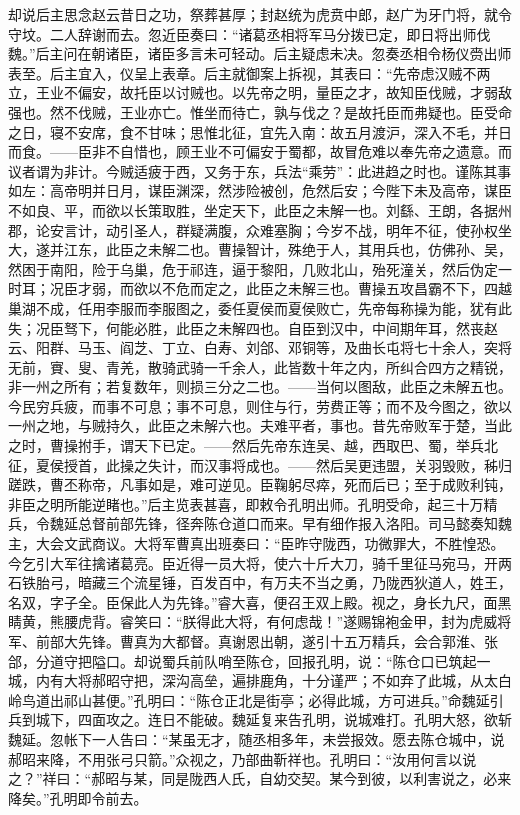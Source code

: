 却说后主思念赵云昔日之功，祭葬甚厚；封赵统为虎贲中郎，赵广为牙门将，就令守坟。二人辞谢而去。忽近臣奏曰：“诸葛丞相将军马分拨已定，即日将出师伐魏。”后主问在朝诸臣，诸臣多言未可轻动。后主疑虑未决。忽奏丞相令杨仪赍出师表至。后主宜入，仪呈上表章。后主就御案上拆视，其表曰：“先帝虑汉贼不两立，王业不偏安，故托臣以讨贼也。以先帝之明，量臣之才，故知臣伐贼，才弱敌强也。然不伐贼，王业亦亡。惟坐而待亡，孰与伐之？是故托臣而弗疑也。臣受命之日，寝不安席，食不甘味；思惟北征，宜先入南：故五月渡沪，深入不毛，并日而食。——臣非不自惜也，顾王业不可偏安于蜀都，故冒危难以奉先帝之遗意。而议者谓为非计。今贼适疲于西，又务于东，兵法“乘劳”：此进趋之时也。谨陈其事如左：高帝明并日月，谋臣渊深，然涉险被创，危然后安；今陛下未及高帝，谋臣不如良、平，而欲以长策取胜，坐定天下，此臣之未解一也。刘繇、王朗，各据州郡，论安言计，动引圣人，群疑满腹，众难塞胸；今岁不战，明年不征，使孙权坐大，遂并江东，此臣之未解二也。曹操智计，殊绝于人，其用兵也，仿佛孙、吴，然困于南阳，险于乌巢，危于祁连，逼于黎阳，几败北山，殆死潼关，然后伪定一时耳；况臣才弱，而欲以不危而定之，此臣之未解三也。曹操五攻昌霸不下，四越巢湖不成，任用李服而李服图之，委任夏侯而夏侯败亡，先帝每称操为能，犹有此失；况臣驽下，何能必胜，此臣之未解四也。自臣到汉中，中间期年耳，然丧赵云、阳群、马玉、阎芝、丁立、白寿、刘郃、邓铜等，及曲长屯将七十余人，突将无前，賨、叟、青羌，散骑武骑一千余人，此皆数十年之内，所纠合四方之精锐，非一州之所有；若复数年，则损三分之二也。——当何以图敌，此臣之未解五也。今民穷兵疲，而事不可息；事不可息，则住与行，劳费正等；而不及今图之，欲以一州之地，与贼持久，此臣之未解六也。夫难平者，事也。昔先帝败军于楚，当此之时，曹操拊手，谓天下已定。——然后先帝东连吴、越，西取巴、蜀，举兵北征，夏侯授首，此操之失计，而汉事将成也。——然后吴更违盟，关羽毁败，秭归蹉跌，曹丕称帝，凡事如是，难可逆见。臣鞠躬尽瘁，死而后已；至于成败利钝，非臣之明所能逆睹也。”后主览表甚喜，即敕令孔明出师。孔明受命，起三十万精兵，令魏延总督前部先锋，径奔陈仓道口而来。早有细作报入洛阳。司马懿奏知魏主，大会文武商议。大将军曹真出班奏曰：“臣昨守陇西，功微罪大，不胜惶恐。今乞引大军往擒诸葛亮。臣近得一员大将，使六十斤大刀，骑千里征马宛马，开两石铁胎弓，暗藏三个流星锤，百发百中，有万夫不当之勇，乃陇西狄道人，姓王，名双，字子全。臣保此人为先锋。”睿大喜，便召王双上殿。视之，身长九尺，面黑睛黄，熊腰虎背。睿笑曰：“朕得此大将，有何虑哉！”遂赐锦袍金甲，封为虎威将军、前部大先锋。曹真为大都督。真谢恩出朝，遂引十五万精兵，会合郭淮、张郃，分道守把隘口。却说蜀兵前队哨至陈仓，回报孔明，说：“陈仓口已筑起一城，内有大将郝昭守把，深沟高垒，遍排鹿角，十分谨严；不如弃了此城，从太白岭鸟道出祁山甚便。”孔明曰：“陈仓正北是街亭；必得此城，方可进兵。”命魏延引兵到城下，四面攻之。连日不能破。魏延复来告孔明，说城难打。孔明大怒，欲斩魏延。忽帐下一人告曰：“某虽无才，随丞相多年，未尝报效。愿去陈仓城中，说郝昭来降，不用张弓只箭。”众视之，乃部曲靳祥也。孔明曰：“汝用何言以说之？”祥曰：“郝昭与某，同是陇西人氏，自幼交契。某今到彼，以利害说之，必来降矣。”孔明即令前去。

